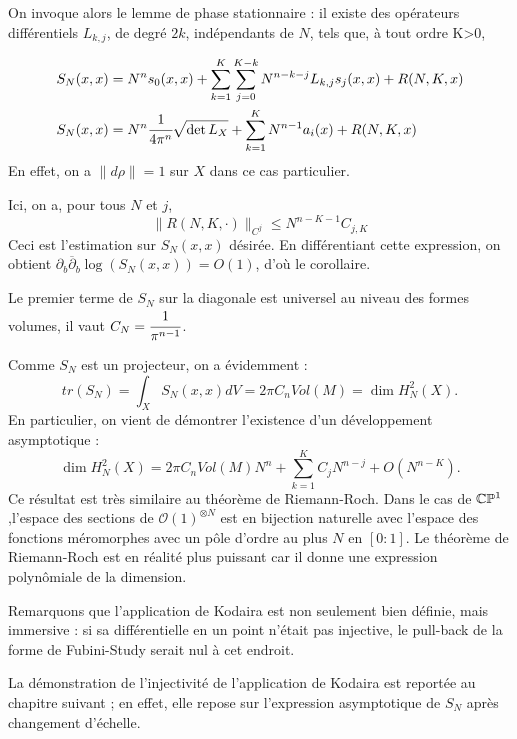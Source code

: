 On invoque alors le lemme de phase stationnaire : il existe des opérateurs différentiels $L_{k,j}$, de degré $2k$, indépendants de $N$, tels que, à tout ordre K>0, 

\begin{align*}
	S_N(x,x) &= N^n s_0(x,x) + \sum_{k=1}^{K}\sum_{j=0}^{K-k}N^{n-k-j}L_{k,j}s_j(x,x) + R(N,K,x)\\
		S_N(x,x) &= N^n \cfrac{1}{4\pi^n}\sqrt{\det{L_X}} + \sum_{k=1}^K N^{n-1}a_i(x) + R(N,K,x)
\end{align*}
En effet, on a $\|d\rho\|=1$ sur $X$ dans ce cas particulier.

Ici, on a, pour tous $N$ et $j$,
\begin{equation*}
  \|R(N,K,\cdot)\|_{C^j} \leq N^{n-K-1}C_{j,K}
\end{equation*}
Ceci est l'estimation sur $S_N(x,x)$ désirée. En différentiant cette expression, on obtient $\partial_b\overline{\partial}_b \log(S_N(x,x)) = O(1)$, d'où le corollaire.

\begin{rem}
	Le premier terme de $S_N$ sur la diagonale est universel au niveau des formes volumes, il vaut $C_N=\cfrac{1}{\pi^{n-1}}$.
\end{rem}
Comme $S_N$ est un projecteur, on a évidemment :
\begin{equation}
  tr(S_N) = \int_XS_N(x,x)dV=2\pi C_nVol(M)=\dim H^2_N(X).
\end{equation}
En particulier, on vient de démontrer l'existence d'un développement asymptotique :
\begin{equation}
  \dim H^2_N(X) = 2\pi C_n Vol(M)N^n+\sum_{k=1}^{K}C_jN^{n-j} + O(N^{n-K}).
\end{equation}
Ce résultat est très similaire au théorème de Riemann-Roch. Dans le cas de $\mathbb{C}\mathbb{P}^1$,l'espace des sections de $\mathcal{O}(1)^{\otimes N}$ est en bijection naturelle avec l'espace des fonctions méromorphes avec un pôle d'ordre au plus $N$ en $[0:1]$. Le théorème de Riemann-Roch est en réalité plus puissant car il donne une expression polynômiale de la dimension.

Remarquons que l'application de Kodaira est non seulement bien définie, mais immersive : si sa différentielle en un point n'était pas injective, le pull-back de la forme de Fubini-Study serait nul à cet endroit.

La démonstration de l'injectivité de l'application de Kodaira est reportée au chapitre suivant ; en effet, elle repose sur l'expression asymptotique de $S_N$ après changement d'échelle.
